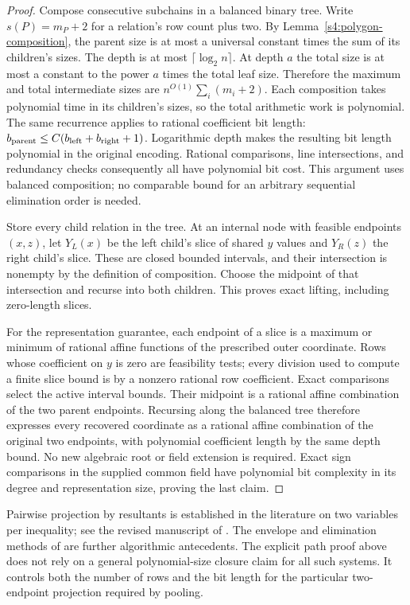 \begin{proof}
Compose consecutive subchains in a balanced binary tree. Write
$s(P)=m_P+2$ for a relation's row count plus two. By
Lemma~\ref{s4:polygon-composition}, the parent size is at most a
universal constant times the sum of its children's sizes. The depth
is at most $\lceil\log_2 n\rceil$. At depth $a$ the total size is
at most a constant to the power $a$ times the total leaf size.
Therefore the maximum and total intermediate sizes are
$n^{O(1)}\sum_i(m_i+2)$. Each composition takes polynomial time in
its children's sizes, so the total arithmetic work is polynomial.
The same recurrence applies to rational coefficient bit length:
$b_{\rm parent}\le C(b_{\rm left}+b_{\rm right}+1)$. Logarithmic
depth makes the resulting bit length polynomial in the original
encoding. Rational comparisons, line intersections, and redundancy
checks consequently all have polynomial bit cost. This argument
uses balanced composition; no comparable bound for an arbitrary
sequential elimination order is needed.

Store every child relation in the tree. At an internal node with
feasible endpoints $(x,z)$, let $Y_L(x)$ be the left child's slice
of shared $y$ values and $Y_R(z)$ the right child's slice. These
are closed bounded intervals, and their intersection is nonempty
by the definition of composition. Choose the midpoint of that
intersection and recurse into both children. This proves exact
lifting, including zero-length slices.

For the representation guarantee, each endpoint of a slice is a
maximum or minimum of rational affine functions of the prescribed
outer coordinate. Rows whose coefficient on $y$ is zero are
feasibility tests; every division used to compute a finite slice
bound is by a nonzero rational row coefficient. Exact comparisons
select the active interval bounds. Their midpoint is a rational
affine combination of the two parent endpoints. Recursing along
the balanced tree therefore expresses every recovered coordinate
as a rational affine combination of the original two endpoints,
with polynomial coefficient length by the same depth bound. No
new algebraic root or field extension is required. Exact sign
comparisons in the supplied common field have polynomial bit
complexity in its degree and representation size, proving the last
claim.
\end{proof}

Pairwise projection by resultants is established in the literature on
two variables per inequality; see the revised manuscript of
\citet[Section~3]{s4:simon2010}. The envelope and elimination methods
of \citet[Section~2]{s4:hochbaum1994} are further algorithmic
antecedents. The explicit path proof above does not rely on a general
polynomial-size closure claim for all such systems. It controls both
the number of rows and the bit length for the particular two-endpoint
projection required by pooling.

